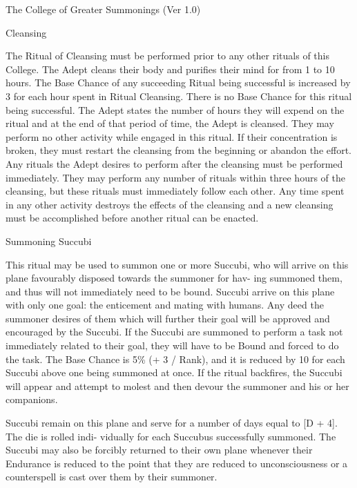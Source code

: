 \begin{Chapter}{The College of Greater Summonings (Ver 1.0)}
\begin{ritual}[Q-1]{Cleansing}
\begin{effects}
The Ritual of Cleansing must be performed prior to any other rituals
of this College.  The Adept cleans their body and purifies their mind
for from 1 to 10 hours.  The Base Chance of any succeeding Ritual
being successful is increased by 3 for each hour spent in Ritual
Cleansing. There is no Base Chance for this ritual being successful.
The Adept states the number of hours they will expend on the ritual
and at the end of that period of time, the Adept is cleansed. They may
perform no other activity while engaged in this ritual.  If their
concentration is broken, they must restart the cleansing from the
beginning or abandon the effort.  Any rituals the Adept desires to
perform after the cleansing must be performed immediately.  They may
perform any number of rituals within three hours of the cleansing, but
these rituals must immediately follow each other. Any time spent in
any other activity destroys the effects of the cleansing and a new
cleansing must be accomplished before another ritual can be enacted.
\end{effects}
\end{ritual}

\begin{ritual}[Q-2]{Summoning Succubi}

\begin{effects}
This ritual may be used to summon one or more Succubi, who will arrive
on this plane favourably disposed towards the summoner for hav- ing
summoned them, and thus will not immediately need to be bound. Succubi
arrive on this plane with only one goal: the enticement and mating
with humans.  Any deed the summoner desires of them which will further
their goal will be approved and encouraged by the Succubi.  If the
Succubi are summoned to perform a task not immediately related to
their goal, they will have to be Bound and forced to do the task. The
Base Chance is 5\% (+ 3 / Rank), and it is reduced by 10 for each
Succubi above one being summoned at once.  If the ritual backfires,
the Succubi will appear and attempt to molest and then devour the
summoner and his or her companions.

Succubi remain on this plane and serve for a number of days equal to
[D + 4]. The die is rolled indi- vidually for each Succubus
successfully summoned. The Succubi may also be forcibly returned to
their own plane whenever their Endurance is reduced to the point that
they are reduced to unconsciousness or a counterspell is cast over
them by their summoner.


\end{effects}
\end{ritual}
\end{Chapter}
